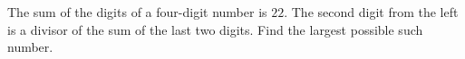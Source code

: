 The sum of the digits of a four-digit number is $22$. The second digit from the left is a divisor of the sum of the last two digits. Find the largest possible such number.
